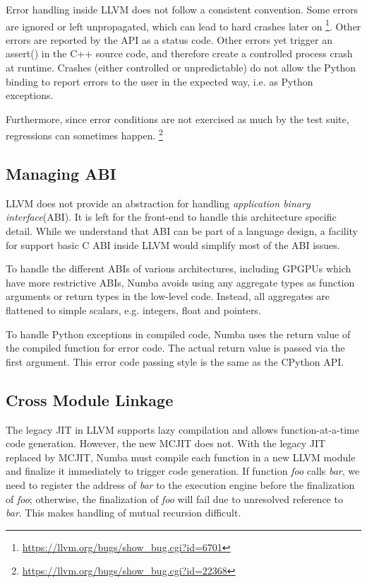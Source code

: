 \documentclass{sig-alternate}
\begin{document}
Error handling inside LLVM does not follow a consistent convention.
Some errors are ignored or left unpropagated, which can lead to hard crashes
later on \footnote{\url{https://llvm.org/bugs/show_bug.cgi?id=6701}}.  Other
errors are reported by the API as a status code.  Other errors yet
trigger an assert() in the C++ source code, and therefore create a
controlled process crash at runtime.  Crashes (either controlled or
unpredictable) do not allow the Python binding to report errors to the
user in the expected way, i.e. as Python exceptions.

Furthermore, since error conditions are not exercised as much by the test
suite, regressions can sometimes happen.
\footnote{\url{https://llvm.org/bugs/show_bug.cgi?id=22368}}

\subsection{Managing ABI}

LLVM does not provide an abstraction for handling \textit{application binary
interface}(ABI). It is left for the front-end to handle this architecture
specific detail.  While we understand that ABI can be part of a language
design, a facility for support basic C ABI inside LLVM would simplify most of the
ABI issues.

To handle the different ABIs of various architectures, including GPGPUs which
have more restrictive ABIs, Numba avoids using any aggregate types as function
arguments or return types in the low-level code.  Instead, all aggregates are
flattened to simple scalars, e.g. integers, float and pointers.

To handle Python exceptions in compiled code, Numba uses the return
value of the compiled function for error code. The actual return value
is passed via the first argument. This error code passing style is the
same as the CPython API.

\subsection{Cross Module Linkage}

The legacy JIT in LLVM supports lazy compilation and allows function-at-a-time
code generation.  However, the new MCJIT does not. With the legacy JIT replaced
by MCJIT, Numba must compile each function in a new LLVM module and finalize it
immediately to trigger code generation. If function \textit{foo} calls
\textit{bar}, we need to register the address of \textit{bar} to the execution
engine before the finalization of \textit{foo}; otherwise, the finalization of
\textit{foo} will fail due to unresolved reference to \textit{bar}.
This makes handling of mutual recursion difficult.
\end{document}

